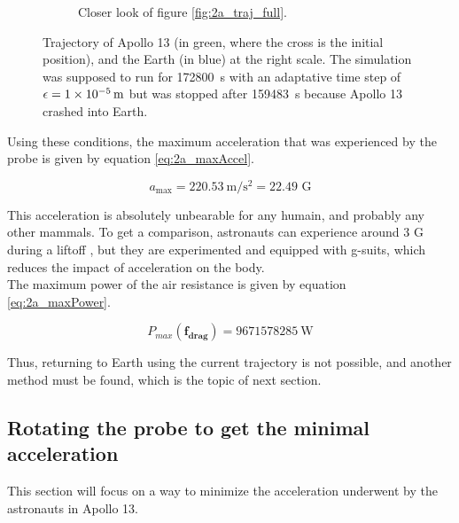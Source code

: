\documentclass[a4paper,12pt,twoside]{article}
\begin{document}
\begin{figure}[h]
\begin{subfigure}[t]{0.45\textwidth}
    \caption{Closer look of figure \ref{fig:2a_traj_full}.}
    \label{fig:fig:2a_traj_close}
  \end{subfigure}
  \caption{Trajectory of Apollo 13 (in green, where the cross is the initial position), and the Earth (in blue) at the right scale. The simulation was supposed to run for \SI{172800}{\s} with an adaptative time step of $\epsilon=\SI{1d-5}{\m}$ but was stopped after \SI{159483}{\s} because Apollo 13 crashed into Earth.}
  \label{fig:2a_traj}
\end{figure}


Using these conditions, the maximum acceleration that was experienced by the probe is given by equation \eqref{eq:2a_maxAccel}.

\begin{equation}
  a_\text{max} = \SI{220.53}{\meter\per\square\second} = \num{22.49}\text{ G}
  \label{eq:2a_maxAccel}
\end{equation}

This acceleration is absolutely unbearable for any humain, and probably any other mammals.
To get a comparison, astronauts can experience around $\num{3}\text{ G}$ during a liftoff \cite{nasa:ask_the_crew}, but they are experimented and equipped with g-suits, which reduces the impact of acceleration \cite{wiki:g-suit} on the body.\\

The maximum power of the air resistance is given by equation \eqref{eq:2a_maxPower}.

\begin{equation}
  P_{max}(\mathbf{f_\text{drag}}) = \SI{9671578285}{\watt} %
  \label{eq:2a_maxPower}
\end{equation}



Thus, returning to Earth using the current trajectory is not possible, and another method must be found, which is the topic of next section.


\subsection{Rotating the probe to get the minimal acceleration}
This section will focus on a way to minimize the acceleration underwent by the astronauts in Apollo 13.
\end{document}
